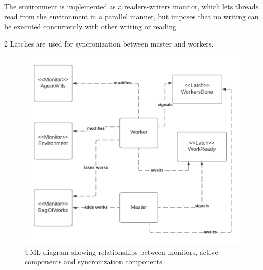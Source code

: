 \documentclass[12pt, a4paper]{report}
\begin{document}
The environment is implemented as a readers-writers monitor, which
 lets threads read from the environment in a parallel manner, but imposes
 that no writing can be executed concurrently with other writing or reading

2 Latches are used for syncronization between master and workers.

\begin{figure}
    \caption{UML diagram showing relationships between monitors, active components and syncronization components}
    \centering
    \includegraphics{UML1.png}
\end{figure}



\end{document}
